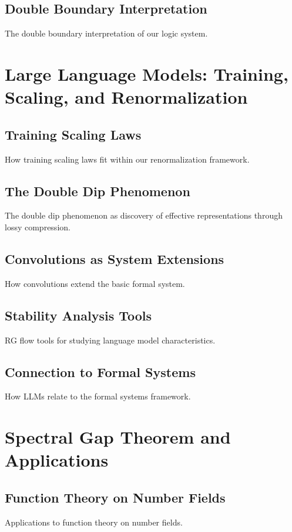\documentclass[11pt,a4paper]{article}
\theoremstyle{definition}
\begin{document}
\subsection{Double Boundary Interpretation}
The double boundary interpretation of our logic system.

\section{Large Language Models: Training, Scaling, and Renormalization}
\label{sec:llms}

\subsection{Training Scaling Laws}
How training scaling laws fit within our renormalization framework.

\subsection{The Double Dip Phenomenon}
The double dip phenomenon as discovery of effective representations through lossy compression.

\subsection{Convolutions as System Extensions}
How convolutions extend the basic formal system.

\subsection{Stability Analysis Tools}
RG flow tools for studying language model characteristics.

\subsection{Connection to Formal Systems}
How LLMs relate to the formal systems framework.

\section{Spectral Gap Theorem and Applications}
\label{sec:spectral-gap}

\subsection{Function Theory on Number Fields}
Applications to function theory on number fields.
\end{document}
